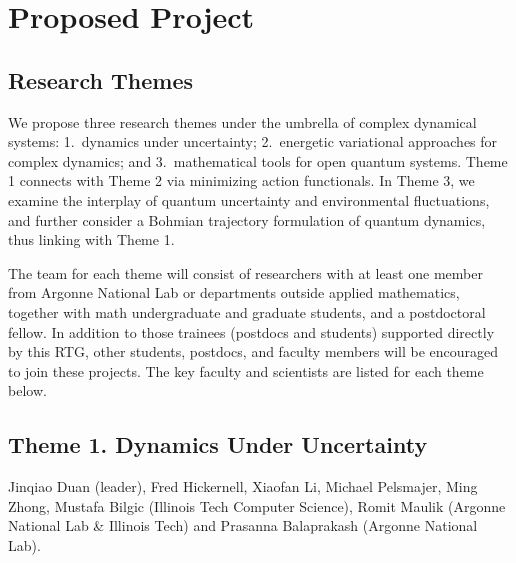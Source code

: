 \documentclass[11pt]{NSFamsart}
\newcommand{\FredNote}[1]{{\color{blue} Fred: #1}}
\begin{document}
\section{Proposed Project } \label{sec:researchproblems}
 

\subsection{Research Themes}

We propose three research themes under the umbrella of complex dynamical systems: 1.\ dynamics under uncertainty; 2.\  energetic variational approaches for complex dynamics; and 3.\ mathematical tools for open quantum systems. Theme 1 connects with Theme 2 via minimizing action functionals. In Theme 3, we examine the interplay of quantum uncertainty and environmental fluctuations, and further consider a Bohmian trajectory formulation of quantum dynamics, thus linking with Theme 1. 

The team for each theme will consist of researchers with at least one member
from Argonne National Lab or departments outside applied mathematics, together with math undergraduate and graduate students, and a postdoctoral
fellow. In addition to those trainees (postdocs and students) supported directly by this RTG, other students, postdocs, and faculty members will be encouraged to join these projects.  The key faculty and scientists are listed for each theme below.

\iffalse  
 While there   may be thematic driven differences on the approach to deliver knowledge and do research, each group share a similar year-round schedule that will allow awareness
and exchange of ideas throughout the academic year, mainly at the RTG graduate seminar.   Finally each summer program is centered on
an intense 2-week period. \FredNote{What does this mean?} Participating undergraduates will have a unique opportunity to work in a serious way on two topics, which we believe to be highly beneficial.
\fi
 

\subsection*{Theme 1. Dynamics  Under Uncertainty } 
Jinqiao Duan (leader), Fred Hickernell, Xiaofan Li,  Michael Pelsmajer, Ming Zhong, Mustafa Bilgic (Illinois Tech Computer Science),  Romit Maulik (Argonne National Lab \& Illinois Tech) and Prasanna Balaprakash (Argonne National Lab). 
\end{document}
